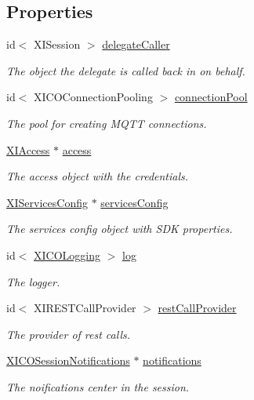 \subsection*{Properties}
\begin{DoxyCompactItemize}
\item 
id$<$ X\+I\+Session $>$ \hyperlink{interface_x_i_session_internal_a8972d65fd7b30480733460a154556c4c}{delegate\+Caller}
\begin{DoxyCompactList}\small\item\em The object the delegate is called back in on behalf. \end{DoxyCompactList}\item 
id$<$ X\+I\+C\+O\+Connection\+Pooling $>$ \hyperlink{interface_x_i_session_internal_a3b9fd1842cfb168e8f8a503cf51226d6}{connection\+Pool}
\begin{DoxyCompactList}\small\item\em The pool for creating M\+Q\+TT connections. \end{DoxyCompactList}\item 
\hyperlink{class_x_i_access}{X\+I\+Access} $\ast$ \hyperlink{interface_x_i_session_internal_a1384b720dcd2a0c74d7f614a9ba041f9}{access}
\begin{DoxyCompactList}\small\item\em The access object with the credentials. \end{DoxyCompactList}\item 
\hyperlink{interface_x_i_services_config}{X\+I\+Services\+Config} $\ast$ \hyperlink{interface_x_i_session_internal_ad51887fa9c72b74e05a63e71619d9cb0}{services\+Config}
\begin{DoxyCompactList}\small\item\em The services config object with S\+DK properties. \end{DoxyCompactList}\item 
id$<$ \hyperlink{protocol_x_i_c_o_logging-p}{X\+I\+C\+O\+Logging} $>$ \hyperlink{interface_x_i_session_internal_a952ede1c227c8e4b04db8daf7fbe1193}{log}
\begin{DoxyCompactList}\small\item\em The logger. \end{DoxyCompactList}\item 
id$<$ X\+I\+R\+E\+S\+T\+Call\+Provider $>$ \hyperlink{interface_x_i_session_internal_a7df5c2d8d7c730b7e6230e195ef23327}{rest\+Call\+Provider}
\begin{DoxyCompactList}\small\item\em The provider of rest calls. \end{DoxyCompactList}\item 
\hyperlink{interface_x_i_c_o_session_notifications}{X\+I\+C\+O\+Session\+Notifications} $\ast$ \hyperlink{interface_x_i_session_internal_a523cb81fba56a180f39be09c7d5e49b1}{notifications}
\begin{DoxyCompactList}\small\item\em The noifications center in the session. \end{DoxyCompactList}\end{DoxyCompactItemize}


